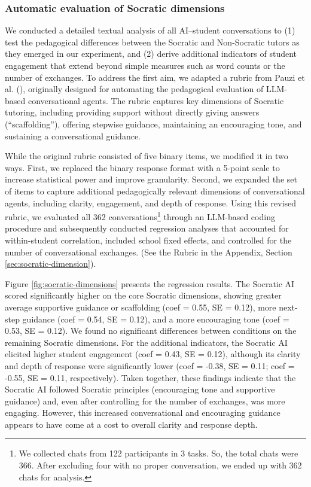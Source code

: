\documentclass[
  11pt,
]{article}
\begin{document}
\subsubsection{Automatic evaluation of Socratic dimensions}\label{automatic-evaluation-of-socratic-dimensions}

We conducted a detailed textual analysis of all AI--student conversations to (1) test the pedagogical differences between the Socratic and Non-Socratic tutors as they emerged in our experiment, and (2) derive additional indicators of student engagement that extend beyond simple measures such as word counts or the number of exchanges. To address the first aim, we adapted a rubric from Pauzi et al. (), originally designed for automating the pedagogical evaluation of LLM-based conversational agents. The rubric captures key dimensions of Socratic tutoring, including providing support without directly giving answers (``scaffolding''), offering stepwise guidance, maintaining an encouraging tone, and sustaining a conversational guidance.

While the original rubric consisted of five binary items, we modified it in two ways. First, we replaced the binary response format with a 5-point scale to increase statistical power and improve granularity. Second, we expanded the set of items to capture additional pedagogically relevant dimensions of conversational agents, including clarity, engagement, and depth of response. Using this revised rubric, we evaluated all 362 conversations\footnote{We collected chats from 122 participants in 3 tasks. So, the total chats were 366. After excluding four with no proper conversation, we ended up with 362 chats for analysis.} through an LLM-based coding procedure and subsequently conducted regression analyses that accounted for within-student correlation, included school fixed effects, and controlled for the number of conversational exchanges. (See the Rubric in the Appendix, Section \ref{sec:socratic-dimension}).

Figure \ref{fig:socratic-dimensions} presents the regression results. The Socratic AI scored significantly higher on the core Socratic dimensions, showing greater average supportive guidance or scaffolding (coef = 0.55, SE = 0.12), more next-step guidance (coef = 0.54, SE = 0.12), and a more encouraging tone (coef = 0.53, SE = 0.12). We found no significant differences between conditions on the remaining Socratic dimensions. For the additional indicators, the Socratic AI elicited higher student engagement (coef = 0.43, SE = 0.12), although its clarity and depth of response were significantly lower (coef = -0.38, SE = 0.11; coef = -0.55, SE = 0.11, respectively). Taken together, these findings indicate that the Socratic AI followed Socratic principles (encouraging tone and supportive guidance) and, even after controlling for the number of exchanges, was more engaging. However, this increased conversational and encouraging guidance appears to have come at a cost to overall clarity and response depth.
\end{document}
